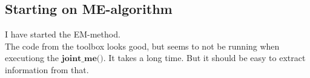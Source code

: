 \subsection{Starting on ME-algorithm}
I have started the EM-method.\\
The code from the toolbox looks good, but seems to not be running when executiong the $\textbf{joint\_me()}$. It takes a long time.
\newline
But it should be easy to extract information from that.
\label{task:20141010_jm0}
